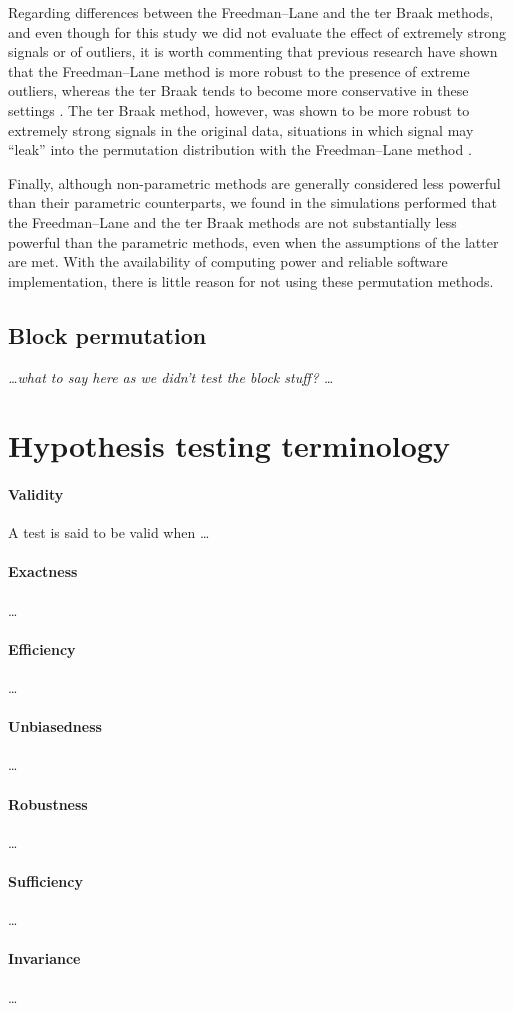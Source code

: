 Regarding differences between the Freedman--Lane and the ter Braak methods, and even though for this study we did not evaluate the effect of extremely strong signals or of outliers, it is worth commenting that previous research have shown that the Freedman--Lane method is more robust to the presence of extreme outliers, whereas the ter Braak tends to become more conservative in these settings \citep{Anderson1999}. The ter Braak method, however, was shown to be more robust to extremely strong signals in the original data, situations in which signal may ``leak'' into the permutation distribution with the Freedman--Lane method \citep{Salimi-Khorshidi2011}.

Finally, although non-parametric methods are generally considered less powerful than their parametric counterparts, we found in the simulations performed that the Freedman--Lane and the ter Braak methods are not substantially less powerful than the parametric methods, even when the assumptions of the latter are met. With the availability of computing power and reliable software implementation, there is little reason for not using these permutation methods.

\subsection{Block permutation}

{\color{orange} \emph{\ldots what to say here as we didn't test the block stuff? \ldots}}

\appendix
\section{Hypothesis testing terminology}
\label{sec:review}

\paragraph{Validity} A test is said to be valid when \ldots

\paragraph{Exactness} \ldots

\paragraph{Efficiency} \ldots

\paragraph{Unbiasedness} \ldots

\paragraph{Robustness} \ldots

\paragraph{Sufficiency} \ldots

\paragraph{Invariance} \ldots